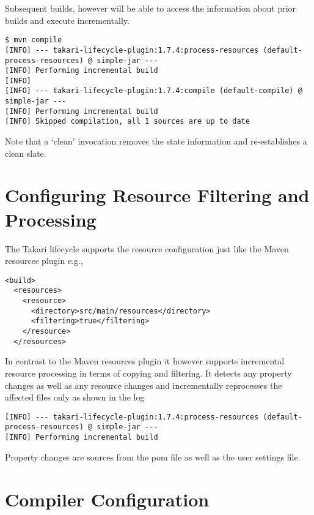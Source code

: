 \documentclass[a4paper]{book}
\newcounter{tab}[chapter]
\begin{document}
Subsequent builds, however will be able to access the information about prior builds and execute incrementally.

\begin{shaded}\begin{verbatim}
$ mvn compile
[INFO] --- takari-lifecycle-plugin:1.7.4:process-resources (default-process-resources) @ simple-jar ---
[INFO] Performing incremental build
[INFO]
[INFO] --- takari-lifecycle-plugin:1.7.4:compile (default-compile) @ simple-jar ---
[INFO] Performing incremental build
[INFO] Skipped compilation, all 1 sources are up to date
\end{verbatim}\end{shaded}

Note that a `clean' invocation removes the state information and re-establishes a clean slate.

\section{Configuring Resource Filtering and Processing}\label{configuring-resource-filtering-and-processing}

The Takari lifecycle supports the resource configuration just like the Maven resources plugin e.g.,

\begin{shaded}\begin{verbatim}
<build>
  <resources>
    <resource>
      <directory>src/main/resources</directory>
      <filtering>true</filtering>
    </resource>
  </resources>
\end{verbatim}\end{shaded}

In contrast to the Maven resources plugin it however supports incremental resource processing in terms of copying and filtering. It detects any property changes as well as any resource changes and incrementally reprocesses the affected files only as shown in the log

\begin{shaded}\begin{verbatim}
[INFO] --- takari-lifecycle-plugin:1.7.4:process-resources (default-process-resources) @ simple-jar ---
[INFO] Performing incremental build
\end{verbatim}\end{shaded}

Property changes are sources from the pom file as well as the user settings file.

\section{Compiler Configuration}\label{compiler-configuration}
\end{document}
